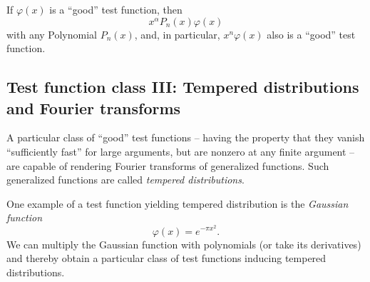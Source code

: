 If $\varphi (x)$ is a ``good'' test function, then
\begin{equation}
x^\alpha P_n (x)\varphi (x)
\end{equation}
with any Polynomial $P_n (x)$, and, in particular, $x^n\varphi (x)  $ also is
 a ``good'' test function.

\subsection{Test function class III: Tempered distributions and Fourier transforms}

A particular class of ``good'' test functions -- having the property that they vanish
``sufficiently fast'' for large arguments, but are nonzero at any finite argument --
are capable of rendering Fourier transforms of generalized functions. Such generalized functions are called
{\em tempered distributions}.

One example of a test function yielding tempered distribution is the {\em Gaussian function}
\begin{equation}
\varphi (x)= e^{-\pi x^2}.
\label{2012-m-ch-di-td}
\end{equation}
We can multiply the Gaussian function with polynomials (or take its derivatives) and thereby obtain a particular class of test functions
inducing tempered distributions.



